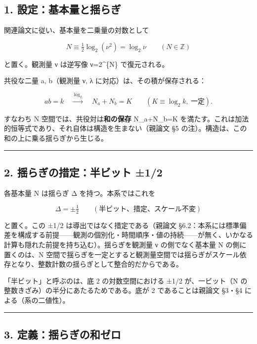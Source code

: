 \documentclass[11pt]{ltjsarticle}
\begin{document}
\subsection{1.
設定：基本量と揺らぎ}\label{ux8a2dux5b9aux57faux672cux91cfux3068ux63faux3089ux304e}

関連論文に従い、基本量を二乗量の対数として

\[N \equiv \tfrac{1}{2}\log_2(\nu^2) = \log_2\nu \qquad (N\in\mathbb{Z})\]

と置く。観測量 ν は逆写像 ν=2\^{}\{N\} で復元される。

共役な二量 a, b（観測量 ν, λ に対応）は、その積が保存される：

\[ab = k \quad\xrightarrow{\ \log_2\ }\quad N_a + N_b = K \qquad (K\equiv\log_2 k,\ \text{一定}).\]

すなわち N 空間では、共役対は\textbf{和の保存} N\_a+N\_b=K
を満たす。これは加法的恒等式であり、それ自体は構造を生まない（親論文 §5
の注）。構造は、この和の上に乗る揺らぎから生じる。

\begin{center}\rule{0.5\linewidth}{0.5pt}\end{center}

\subsection{2. 揺らぎの措定：半ビット
±1/2}\label{ux63faux3089ux304eux306eux63aaux5b9aux534aux30d3ux30c3ux30c8-12}

各基本量 N は揺らぎ Δ を持つ。本系ではこれを

\[\Delta = \pm\tfrac{1}{2} \qquad (\text{半ビット、措定、スケール不変})\]

と置く。この ±1/2 は導出ではなく措定である（親論文
§6.2：本系には標準偏差を構成する前提------観測の個別化・時間順序・値の持続------が無く、いかなる計算も隠れた前提を持ち込む）。揺らぎを観測量
ν の側でなく基本量 N の側に置くのは、N
空間で揺らぎを一定とすると観測量空間では揺らぎがスケール依存となり、整数計数の揺らぎとして整合的だからである。

「半ビット」と呼ぶのは、底 2 の対数空間における ±1/2 が、一ビット（N
の整数きざみ）の半分にあたるためである。底が 2 であることは親論文 §3・§4
による（系の二値性）。

\begin{center}\rule{0.5\linewidth}{0.5pt}\end{center}

\subsection{3.
定義：揺らぎの和ゼロ}\label{ux5b9aux7fa9ux63faux3089ux304eux306eux548cux30bcux30ed}
\end{document}
